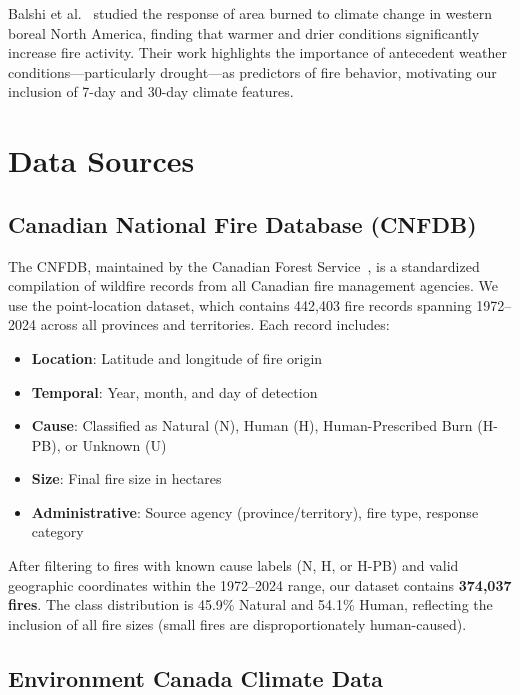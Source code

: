 \documentclass[sigconf,nonacm]{acmart}
\begin{document}
Balshi et al.~\cite{balshi2009} studied the response of area burned to climate change in western boreal North America, finding that warmer and drier conditions significantly increase fire activity. Their work highlights the importance of antecedent weather conditions---particularly drought---as predictors of fire behavior, motivating our inclusion of 7-day and 30-day climate features.

\section{Data Sources}

\subsection{Canadian National Fire Database (CNFDB)}

The CNFDB, maintained by the Canadian Forest Service~\cite{cwfis2025}, is a standardized compilation of wildfire records from all Canadian fire management agencies. We use the point-location dataset, which contains 442,403 fire records spanning 1972--2024 across all provinces and territories. Each record includes:

\begin{itemize}
    \item \textbf{Location}: Latitude and longitude of fire origin
    \item \textbf{Temporal}: Year, month, and day of detection
    \item \textbf{Cause}: Classified as Natural (N), Human (H), Human-Prescribed Burn (H-PB), or Unknown (U)
    \item \textbf{Size}: Final fire size in hectares
    \item \textbf{Administrative}: Source agency (province/territory), fire type, response category
\end{itemize}

After filtering to fires with known cause labels (N, H, or H-PB) and valid geographic coordinates within the 1972--2024 range, our dataset contains \textbf{374,037 fires}. The class distribution is 45.9\% Natural and 54.1\% Human, reflecting the inclusion of all fire sizes (small fires are disproportionately human-caused).

\subsection{Environment Canada Climate Data}
\end{document}
